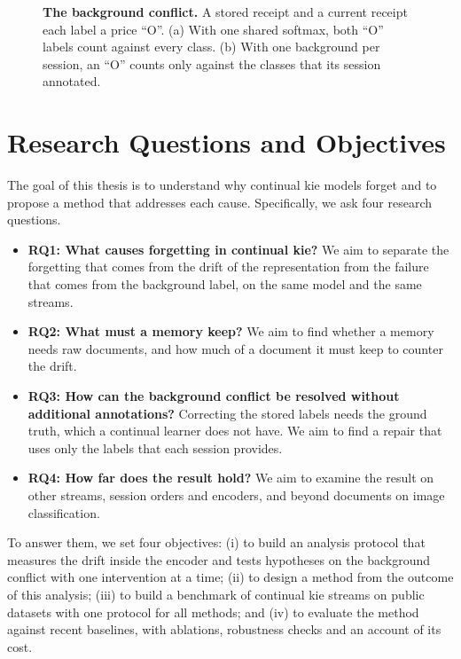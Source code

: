 \begin{figure}[!htbp]
  \centering
  \caption[The background conflict]{\textbf{The background conflict.} A stored receipt and
  a current receipt each label a price ``O''. (a) With one shared softmax, both ``O'' labels
  count against every class. (b) With one background per session, an ``O'' counts only
  against the classes that its session annotated.}
  \label{fig:conflict}
\end{figure}

\section{Research Questions and Objectives}
\label{sec:c1-s3}

The goal of this thesis is to understand why continual \gls{kie} models forget and to
propose a method that addresses each cause. Specifically, we ask four research questions.

\begin{itemize}
  \item \textbf{RQ1: What causes forgetting in continual \gls{kie}?} We aim to separate
        the forgetting that comes from the drift of the representation from the failure
        that comes from the background label, on the same model and the same streams.
  \item \textbf{RQ2: What must a memory keep?} We aim to find whether a memory needs raw
        documents, and how much of a document it must keep to counter the drift.
  \item \textbf{RQ3: How can the background conflict be resolved without additional
        annotations?} Correcting the stored labels needs the ground truth, which a
        continual learner does not have. We aim to find a repair that uses only the labels
        that each session provides.
  \item \textbf{RQ4: How far does the result hold?} We aim to examine the result on other
        streams, session orders and encoders, and beyond documents on image
        classification.
\end{itemize}

\noindent To answer them, we set four objectives: (i) to build an analysis protocol that
measures the drift inside the encoder and tests hypotheses on the background conflict with
one intervention at a time; (ii) to design a method from the outcome of this analysis;
(iii) to build a benchmark of continual \gls{kie} streams on public datasets with one
protocol for all methods; and (iv) to evaluate the method against recent baselines, with
ablations, robustness checks and an account of its cost.

